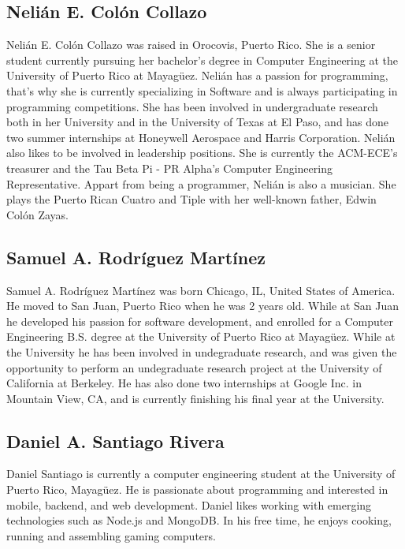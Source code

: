 
\subsection{Nelián E. Colón Collazo}
Nelián E. Colón Collazo was raised in Orocovis, Puerto Rico. She is a senior student currently pursuing her bachelor's degree in Computer Engineering at the University of Puerto Rico at Mayagüez. Nelián has a passion for programming, that's why she is currently specializing in Software and is always participating in programming competitions. She has been involved in undergraduate research both in her University and in the University of Texas at El Paso, and has done two summer internships at Honeywell Aerospace and Harris Corporation. Nelián also likes to be involved in leadership positions. She is currently the ACM-ECE's treasurer and the Tau Beta Pi - PR Alpha's Computer Engineering Representative. Appart from being a programmer, Nelián is also a musician. She plays the Puerto Rican Cuatro and Tiple with her well-known father, Edwin Colón Zayas. 

\subsection{Samuel A. Rodríguez Martínez}
Samuel A. Rodríguez Martínez was born Chicago, IL, United States of America. He moved to San Juan,
Puerto Rico when he was 2 years old. While at San Juan he developed his passion for software
development, and enrolled for a Computer Engineering B.S. degree at the University of Puerto Rico at
Mayagüez. While at the University he has been involved in undegraduate research, and was given the
opportunity to perform an undegraduate research project at the University of California at Berkeley.
He has also done two internships at Google Inc. in Mountain View, CA, and is currently finishing his
final year at the University.

\subsection{Daniel A. Santiago Rivera}
Daniel Santiago is currently a computer engineering student at the University of Puerto Rico, Mayagüez. He is passionate about programming and interested in mobile, backend, and web development. Daniel likes working with emerging technologies such as Node.js and MongoDB. In his free time, he enjoys cooking, running and assembling gaming computers.
